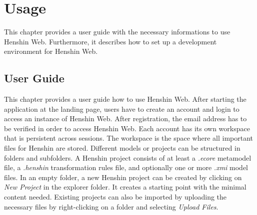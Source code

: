 \chapter{Usage}
\label{chap:usage}

This chapter provides a user guide with the necessary informations to use Henshin Web. Furthermore, it describes how to set up a development environment for Henshin Web.

\section{User Guide}
\label{sec:user_guide}

This chapter provides a user guide how to use Henshin Web. After starting the application at the landing page, users have to create an account and login to access an instance of Henshin Web. After registration, the email address has to be verified in order to access Henshin Web. Each account has its own workspace that is persistent across sessions. The workspace is the space where all important files for Henshin are stored. Different models or projects can be structured in folders and subfolders. A Henshin project consists of at least a \textit{.ecore} metamodel file, a \textit{.henshin} transformation rules file, and optionally one or more \textit{.xmi} model files. In an empty folder, a new Henshin project can be created by clicking on \textit{New Project} in the explorer folder. It creates a starting point with the minimal content needed. Existing projects can also be imported by uploading the necessary files by right-clicking on a folder and selecting \textit{Upload Files}. 

